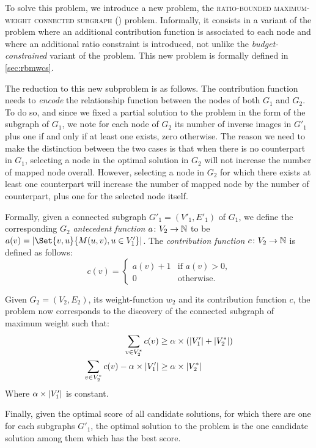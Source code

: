 			To solve this problem, we introduce a new problem, the \textsc{ratio-bounded maximum-weight connected subgraph} (\rbmwcs) problem.
			Informally, it consists in a variant of the \mwcs{} problem where an additional contribution function is associated to each node and where an additional ratio constraint is introduced, not unlike the \emph{budget-constrained} variant of the \mwcs{} problem.
			This new problem is formally defined in \cref{sec:rbmwcs}.

			The reduction to this new subproblem is as follows.
			The contribution function needs to \emph{encode} the relationship function between the nodes of both $G_1$ and $G_2$.
			To do so, and since we fixed a partial solution to the problem in the form of the subgraph of $G_1$, we note for each node of $G_2$ its number of inverse images in $G'_1$ plus one if and only if at least one exists, zero otherwise.
			The reason we need to make the distinction between the two cases is that when there is no counterpart in $G_1$, selecting a node in the optimal solution in $G_2$ will not increase the number of mapped node overall.
			However, selecting a node in $G_2$ for which there exists at least one counterpart will increase the number of mapped node by the number of counterpart, plus one for the selected node itself.

			Formally, given a connected subgraph $G'_1=(V'_1,E'_1)$ of $G_1$, we define the corresponding $G_2$ \emph{antecedent function} $a\colon V_2 \to \mathbb{N}$ to be $a(v)=\card{\Set{v,u}{M(u,v), u\in V'_1}}$.
			The \emph{contribution function} $c\colon V_2 \to \mathbb{N}$ is defined as follows:
			$$c(v)=\begin{cases}a(v) + 1 &\mbox{if }a(v) > 0\mbox{,} \\
		                       0        &\mbox{otherwise.}
		          \end{cases}$$

			Given $G_2=(V_2,E_2)$, its weight-function $w_2$ and its contribution function $c$, the problem now corresponds to the discovery of the connected subgraph of maximum weight such that:
			\begin{align*}
				\sum_{v \in V^*_2}{c(v)}                           &\geq \alpha\times\left(\lvert V'_1\rvert + \lvert V^*_2\rvert\right) \\
				\sum_{v \in V^*_2}{c(v)} - \alpha\times\lvert V'_1\rvert &\geq \alpha\times\lvert V^*_2\rvert
			\end{align*}
			Where $\alpha\times\lvert V_1'\rvert$ is constant.

			Finally, given the optimal score of all candidate solutions, for which there are one for each subgraphs $G'_1$, the optimal solution to the \mwccs{} problem is the one candidate solution among them which has the best score.

